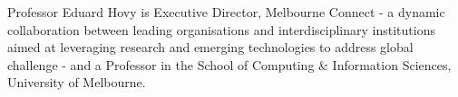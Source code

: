Professor Eduard Hovy is Executive Director, Melbourne Connect - a dynamic collaboration between leading organisations and interdisciplinary institutions aimed at leveraging research and emerging technologies to address global challenge - and a Professor in the School of Computing \& Information Sciences, University of Melbourne.